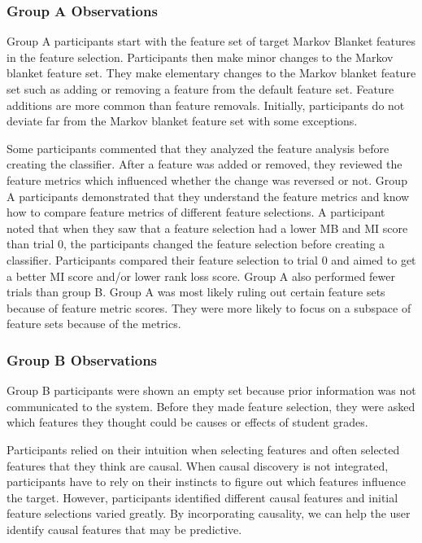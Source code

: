 \subsubsection { Group A Observations }
Group A participants start with the feature set of target Markov Blanket features in the feature selection. Participants then make minor changes to the Markov blanket feature set. They make elementary changes to the Markov blanket feature set such as adding or removing a feature from the default feature set. Feature additions are more common than feature removals. Initially, participants do not deviate far from the Markov blanket feature set with some exceptions.

Some participants commented that they analyzed the feature analysis before creating the classifier. After a feature was added or removed, they reviewed the feature metrics which influenced whether the change was reversed or not. Group A participants demonstrated that they understand the feature metrics and know how to compare feature metrics of different feature selections. A participant noted that when they saw that a feature selection had a lower MB and MI score than trial 0, the participants changed the feature selection before creating a classifier.
Participants compared their feature selection to trial 0 and aimed to get a better MI score and/or lower rank loss score. Group A also performed fewer trials than group B. Group A was most likely ruling out certain feature sets because of feature metric scores. They were more likely to focus on a subspace of feature sets because of the metrics.

\subsubsection { Group B Observations }
Group B participants were shown an empty set because prior information was not communicated to the system. Before they made feature selection, they were asked which features they thought could be causes or effects of student grades.

Participants relied on their intuition when selecting features and often selected features that they think are causal. When causal discovery is not integrated, participants have to rely on their instincts to figure out which features influence the target. However, participants identified different causal features and initial feature selections varied greatly. By incorporating causality, we can help the user identify causal features that may be predictive.

